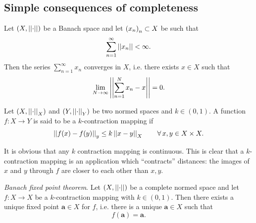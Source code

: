 \documentclass{article}
\begin{document}
\subsection{Simple consequences of completeness}
\begin{proposition}
	Let $\left(X,\left|\left|\cdot\right|\right|\right)$ be a Banach space and let ${\left({x}_{n}\right)}_{n}\subset X$ be such that
	\begin{equation*}
		\sum_{n=1}^{\infty}\left|\left|x_{n}\right|\right|<\infty.
	\end{equation*}
	Then the series $\sum_{n=1}^{\infty}x_{n}$ converges in $X$, i.e. there exists $x\in X$ such that
	\begin{equation*}
		\lim_{N\to\infty}\left|\left|\sum_{n=1}^{N}x_{n}-x\right|\right|=0.
	\end{equation*}
\end{proposition}
\begin{definition}
	Let $\left(X,\left|\left|\cdot\right|\right|_{X}\right)$ and $\left(Y,\left|\left|\cdot\right|\right|_{Y}\right)$ be two normed spaces and $k\in(0,1)$. A function $f:X\to Y$ is said to be a $k$-contraction mapping if
	\begin{equation*}
		\left|\left|f(x)-f(y)\right|\right|_{y}\leq k\left|\left|x-y\right|\right|_{X}\qquad\forall\, x,y\in X\times X.
	\end{equation*}
\end{definition}
It is obvious that any $k$ contraction mapping is continuous. This is clear that a $k$-contraction mapping is an application which ``contracts'' distances: the images of $x$ and $y$ through $f$ are closer to each other than $x,y$.
\begin{theorem}
	\emph{Banach fixed point theorem}. Let $\left(X,\left|\left|\cdot\right|\right|\right)$ be a complete normed space and let $f:X\to X$ be a $k$-contraction mapping with $k\in(0,1)$. Then there exists a unique fixed point $\bm{a}\in X$ for $f$, i.e. there is a unique $\bm{a}\in X$ such that
	\begin{equation*}
		f(\bm{a})=\bm{a}.
	\end{equation*}
\end{theorem}
\end{document}
